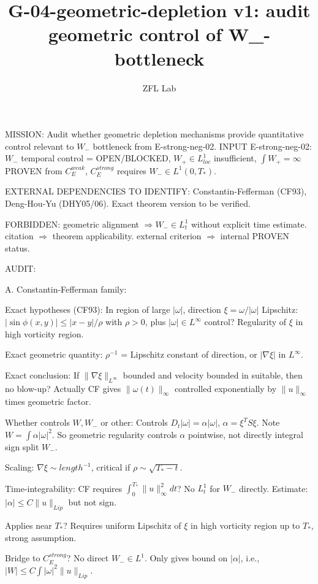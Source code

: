 \documentclass[11pt]{article}
\title{G-04-geometric-depletion v1: audit geometric control of W\_- bottleneck}
\author{ZFL Lab}
\begin{document}
\maketitle

MISSION: Audit whether geometric depletion mechanisms provide quantitative control relevant to $W_-$ bottleneck from E-strong-neg-02.
INPUT E-strong-neg-02: $W_-$ temporal control = OPEN/BLOCKED, $W_+\in L^1_{loc}$ insufficient, $\int W_+=\infty$ PROVEN from $C_E^{weak}$, $C_E^{strong}$ requires $W_-\in L^1(0,T_*)$.

EXTERNAL DEPENDENCIES TO IDENTIFY:
Constantin-Fefferman (CF93), Deng-Hou-Yu (DHY05/06). Exact theorem version to be verified.

FORBIDDEN:
geometric alignment $\Rightarrow W_-\in L^1_t$ without explicit time estimate.
citation $\Rightarrow$ theorem applicability.
external criterion $\Rightarrow$ internal PROVEN status.

AUDIT:

A. Constantin-Fefferman family:

Exact hypotheses (CF93):
In region of large $|\omega|$, direction $\xi=\omega/|\omega|$ Lipschitz: $|\sin\phi(x,y)|\le |x-y|/\rho$ with $\rho>0$, plus $|\omega|\in L^\infty$ control? Regularity of $\xi$ in high vorticity region.

Exact geometric quantity:
$\rho^{-1}$ = Lipschitz constant of direction, or $|\nabla\xi|$ in $L^\infty$.

Exact conclusion:
If $\|\nabla\xi\|_{L^\infty}$ bounded and velocity bounded in suitable, then no blow-up? Actually CF gives $ \|\omega(t)\|_\infty$ controlled exponentially by $\|u\|_\infty$ times geometric factor.

Whether controls $W,W_-$ or other:
Controls $D_t|\omega| = \alpha |\omega|$, $\alpha = \xi^T S \xi$. Note $W=\int \alpha |\omega|^2$. So geometric regularity controls $\alpha$ pointwise, not directly integral sign split $W_-$.

Scaling:
$\nabla\xi\sim length^{-1}$, critical if $\rho\sim \sqrt{T_*-t}$.

Time-integrability:
CF requires $\int_0^{T_*} \|u\|_\infty^2 dt$? No $L^1_t$ for $W_-$ directly. Estimate: $|\alpha|\le C\|u\|_{Lip}$ but not sign.

Applies near $T_*$? Requires uniform Lipschitz of $\xi$ in high vorticity region up to $T_*$, strong assumption.

Bridge to $C_E^{strong}$?
No direct $W_-\in L^1$. Only gives bound on $|\alpha|$, i.e., $|W|\le C\int |\omega|^2\|u\|_{Lip}$.
\end{document}
